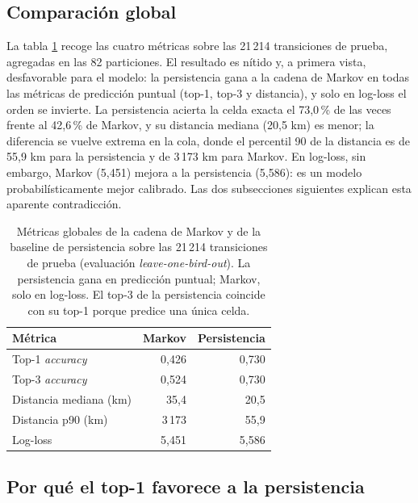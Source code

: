 \subsection{Comparación global}
\label{sec:o2-global}

La tabla \ref{tab:o2-global} recoge las cuatro métricas sobre las 21\,214
transiciones de prueba, agregadas en las 82 particiones. El resultado es nítido y, a
primera vista, desfavorable para el modelo: la persistencia gana a la cadena de Markov
en todas las métricas de predicción puntual (top-1, top-3 y distancia), y solo en
log-loss el orden se invierte. La persistencia acierta la celda exacta el 73,0\,\% de
las veces frente al 42,6\,\% de Markov, y su distancia mediana (20,5 km) es menor; la
diferencia se vuelve extrema en la cola, donde el percentil 90 de la distancia es de
55,9 km para la persistencia y de 3\,173 km para Markov. En log-loss, sin embargo,
Markov (5,451) mejora a la persistencia (5,586): es un modelo probabilísticamente
mejor calibrado. Las dos subsecciones siguientes explican esta aparente contradicción.

\begin{table}[H]
  \centering
  \caption[Comparación global Markov frente a persistencia]{Métricas globales de la
  cadena de Markov y de la baseline de persistencia sobre las 21\,214 transiciones de
  prueba (evaluación \textit{leave-one-bird-out}). La persistencia gana en predicción
  puntual; Markov, solo en log-loss. El top-3 de la persistencia coincide con su top-1
  porque predice una única celda.}
  \label{tab:o2-global}
  \begin{tabular}{lrr}
    \toprule
    \textbf{Métrica} & \textbf{Markov} & \textbf{Persistencia} \\
    \midrule
    Top-1 \textit{accuracy}    & 0,426 & 0,730 \\
    Top-3 \textit{accuracy}    & 0,524 & 0,730 \\
    Distancia mediana (km)     & 35,4  & 20,5 \\
    Distancia p90 (km)         & 3\,173 & 55,9 \\
    Log-loss                   & 5,451 & 5,586 \\
    \bottomrule
  \end{tabular}
\end{table}

\subsection{Por qué el top-1 favorece a la persistencia}
\label{sec:o2-estructural}

